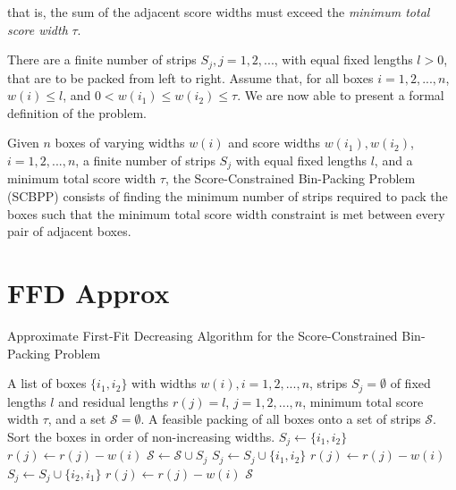 \documentclass[oribibl]{llncs}
\begin{document}
that is, the sum of the adjacent score widths must exceed the \textit{minimum total score width} $\tau$.

There are a finite number of strips $S_j, j = 1, 2, ...$, with equal fixed lengths $l > 0$, that are to be packed from left to right. Assume that, for all boxes $i = 1, 2, ..., n$, $w(i) \leq l$, and $0 < w(i_1) \leq w(i_2) \leq \tau$. We are now able to present a formal definition of the problem.

\begin{definition}
	Given $n$ boxes of varying widths $w(i)$ and score widths $w(i_1), w(i_2)$, $i = 1, 2, ..., n$, a finite number of strips $S_j$ with equal fixed lengths $l$, and a minimum total score width $\tau$, the Score-Constrained Bin-Packing Problem (SCBPP) consists of finding the minimum number of strips required to pack the boxes such that the minimum total score width constraint is met between every pair of adjacent boxes. 
\end{definition}


\section{FFD Approx}
\label{sec:ffdapprox}








\begin{algorithm}[H]
	\caption{\textcolor{OliveGreen}{Approximate First-Fit Decreasing Algorithm for the Score-Constrained Bin-Packing Problem}}
	\label{alg:ffdapprox}
	\begin{algorithmic}[1]
	\Require A list of boxes $\{i_1, i_2\}$ with widths $w(i), i = 1, 2, ..., n$, strips $S_j = \emptyset$ of fixed lengths $l$ and residual lengths $r(j) = l$, $j = 1, 2, ...,n$, minimum total score width $\tau$, and a set $\mathcal{S} = \emptyset$.
	\Ensure A feasible packing of all boxes onto a set of strips $\mathcal{S}$.
	\State Sort the boxes in order of non-increasing widths.
				\State $S_j \gets \{i_1, i_2\}$
				\State $r(j) \gets r(j) - w(i)$
				\State $\mathcal{S} \gets \mathcal{S} \cup S_j$
				\Break
					\State $S_j \gets S_j \cup \{i_1, i_2\}$
					\State $r(j) \gets r(j) - w(i)$
					\Break
					\State $S_j \gets S_j \cup \{i_2, i_1\}$
					\State $r(j) \gets r(j) - w(i)$
					\Break
				\EndIf
			\EndIf
		\EndFor
	\EndFor
	\Return $\mathcal{S}$
	\end{algorithmic}	
\end{algorithm}
\end{document}
